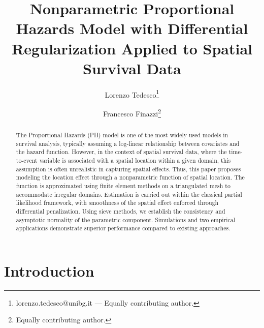 \documentclass[11pt]{article}
\title{Nonparametric Proportional Hazards Model with Differential Regularization Applied to Spatial Survival Data}
\author[1]{Lorenzo Tedesco\thanks{lorenzo.tedesco@unibg.it --- Equally contributing author.}}
\author[1]{Francesco Finazzi\thanks{Equally contributing author.}}
\affil[1]{Department of Economics, University of Bergamo, Via dei Caniana 2, 24127 Bergamo (BG), Italy}
\date{} %
\begin{document}
\maketitle

\begin{abstract}%

The Proportional Hazards (PH) model is one of the most widely used models in survival analysis, typically assuming a log-linear relationship between covariates and the hazard function. However, in the context of spatial survival data, where the time-to-event variable is associated with a spatial location within a given domain, this assumption is often unrealistic in capturing spatial effects. Thus, this paper proposes modeling the location effect through a nonparametric function of spatial location. The function is approximated using finite element methods on a triangulated mesh to accommodate irregular domains. Estimation is carried out within the classical partial likelihood framework, with smoothness of the spatial effect enforced through differential penalization. Using sieve methods, we establish the consistency and asymptotic normality of the parametric component. Simulations and two empirical applications demonstrate superior performance compared to existing approaches. 
\end{abstract}


\section{Introduction}\label{sec:introduction}
\end{document}
